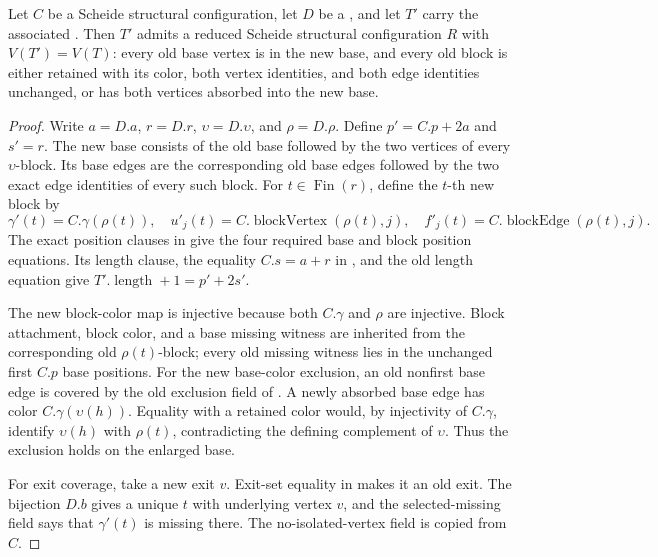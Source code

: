 \begin{helper}
Let $C$ be a Scheide structural configuration, let $D$ be a
, and let $T'$ carry the associated
.  Then $T'$ admits a reduced
Scheide structural configuration $R$ with $V(T')=V(T)$: every old base
vertex is in the new base, and every old block is either retained with its
color, both vertex identities, and both edge identities unchanged, or has
both vertices absorbed into the new base.
\end{helper}
\begin{proof}
Write $a=D.a$, $r=D.r$, $\upsilon=D.\upsilon$, and $\rho=D.\rho$.  Define
$p'=C.p+2a$ and $s'=r$.  The new base consists of the old base followed by
the two vertices of every $\upsilon$-block.  Its base edges are the
corresponding old base edges followed by the two exact edge identities of
every such block.  For $t\in\operatorname{Fin}(r)$, define the $t$-th new
block by
\[
 \gamma'(t)=C.\gamma(\rho(t)),\quad
 u'_j(t)=C.\operatorname{blockVertex}(\rho(t),j),\quad
 f'_j(t)=C.\operatorname{blockEdge}(\rho(t),j).
\]
The exact position clauses in
 give the four required base and
block position equations.  Its length clause, the equality $C.s=a+r$ in
, and the old length equation give
$T'.\operatorname{length}+1=p'+2s'$.

The new block-color map is injective because both $C.\gamma$ and $\rho$
are injective.  Block attachment, block color, and a base missing witness
are inherited from the corresponding old $\rho(t)$-block; every old
missing witness lies in the unchanged first $C.p$ base positions.  For the
new base-color exclusion, an old nonfirst base edge is covered by the old
exclusion field of .  A newly
absorbed base edge has color $C.\gamma(\upsilon(h))$.  Equality with a
retained color would, by injectivity of $C.\gamma$, identify
$\upsilon(h)$ with $\rho(t)$, contradicting the defining complement of
$\upsilon$.  Thus the exclusion holds on the enlarged base.

For exit coverage, take a new exit $v$.  Exit-set equality in
 makes it an old exit.  The
bijection $D.b$ gives a unique $t$ with underlying vertex $v$, and the
selected-missing field says that $\gamma'(t)$ is missing there.  The
no-isolated-vertex field is copied from $C$.


\end{proof}
